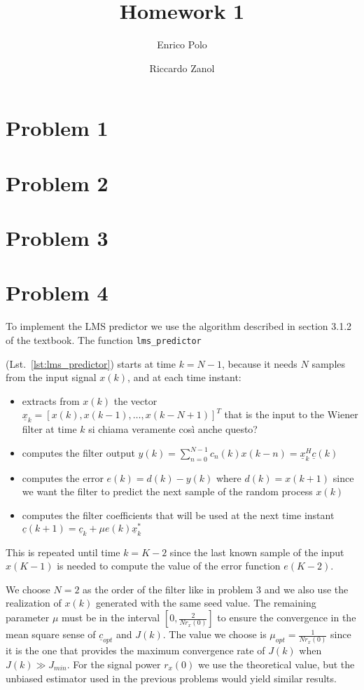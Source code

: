 \documentclass{article}
\author{Enrico Polo \and Riccardo Zanol}
\title{Homework 1}
\newcommand{\inlinecode}[1]{
  \lstinline[basicstyle=\ttfamily,keywordstyle={}]{#1}
}
\renewcommand{\vec}[1]{
  \underline{#1}
}
\begin{document}
\maketitle
\section*{Problem 1}
\section*{Problem 2}
\section*{Problem 3}
\section*{Problem 4}
To implement the LMS predictor we use the algorithm described in
section 3.1.2 of the textbook. The function \inlinecode{lms_predictor}
(Lst.~\ref{lst:lms_predictor}) starts at time $k=N-1$, because it
needs $N$ samples from the input signal $x(k)$, and at each
time instant:
\begin{itemize}
  \item extracts from $x(k)$ the vector $\vec{x}_k = [x(k),
    x(k-1),\dots,x(k-N+1)]^T$ that is the input to the Wiener filter
    at time $k$ {\color{red} si chiama veramente così anche questo?}
  \item computes the filter output $y(k) =
    \sum_{n=0}^{N-1}c_n(k)x(k-n) = \vec{x}_k^H\vec{c}(k)$
  \item computes the error $e(k) = d(k) - y(k)$ where $d(k) = x(k+1)$
    since we want the filter to predict the next sample of the random
    process $x(k)$
  \item computes the filter coefficients that will be used at the next
    time instant $\vec{c}(k+1) = \vec{c}_k + \mu e(k) \vec{x}_k^*$
\end{itemize}
This is repeated until time $k = K - 2$ since the last known sample of
the input $x(K-1)$ is needed to compute the value of the error
function $e(K-2)$.

We choose $N = 2$ as the order of the filter like in problem 3 and we
also use the realization of $x(k)$ generated with the same seed
value. The remaining parameter $\mu$ must be in the interval $
\left[0,\frac{2}{Nr_x(0)}\right] $ to ensure the convergence in the
mean square sense of $\vec{c}_{opt}$ and $J(k)$. The value we choose
is $\mu_{opt} = \frac{1}{Nr_x(0)}$ since it is the one that provides
the maximum convergence rate of $J(k)$ when $J(k) \gg J_{min}$. For
the signal power $r_x(0)$ we use the theoretical value, but the
unbiased estimator used in the previous problems would yield similar
results.
\end{document}
